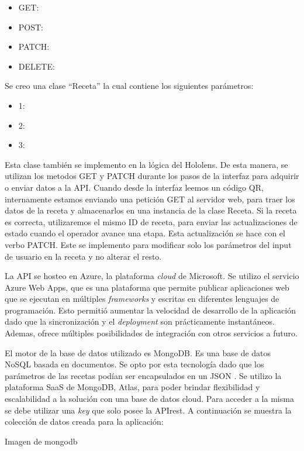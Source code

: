 \begin{itemize}
\item GET: 
\item POST: 
\item PATCH:
\item DELETE:
\end{itemize}

Se creo una clase ``Receta'' la cual contiene los siguientes parámetros:

\begin{itemize}
\item 1: 
\item 2:
\item 3:
\end{itemize}

Esta clase también se implemento en la lógica del Hololens. De esta manera, se utilizan los metodos GET y PATCH durante los pasos de la interfaz para adquirir o enviar datos a la API. Cuando desde la interfaz leemos un código QR, internamente estamos enviando una petición GET al servidor web, para traer los datos de la receta y almacenarlos en una instancia de la clase Receta. Si la receta es correcta, utilizaremos el mismo ID de receta, para enviar las actualizaciones de estado cuando el operador avance una etapa. Esta actualización se hace con el verbo PATCH. Este se implemento para modificar solo los parámetros del input de usuario en la receta y no alterar el resto. 

La API se hosteo en Azure, la plataforma \textit{cloud} de Microsoft. Se utilizo el servicio Azure Web Apps, que es una plataforma que permite publicar aplicaciones web que se ejecutan en múltiples \textit{frameworks} y escritas en diferentes lenguajes de programación. Esto permitió aumentar la velocidad de desarrollo de la aplicación dado que la sincronización y el \textit{deployment} son prácticamente instantáneos. Ademas, ofrece múltiples posibilidades de integración con otros servicios a futuro.

El motor de la base de datos utilizado es MongoDB. Es una base de datos NoSQL basada en documentos. Se opto por esta tecnología dado que los parámetros de las recetas podían ser encapsulados en un JSON . Se utilizo la plataforma SaaS de MongoDB, Atlas, para poder brindar flexibilidad y escalabilidad a la solución con una base de datos cloud. Para acceder a la misma se debe utilizar una \textit{key} que solo posee la APIrest. A continuación se muestra la colección de datos creada para la aplicación:

Imagen de mongodb

